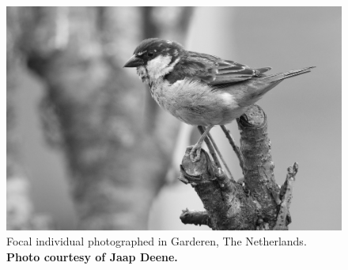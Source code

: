 \begin{titlepage}
\vspace{6\baselineskip}

\begin{figure}[h!]
\centering
\includegraphics[width=1\textwidth]{./Figures/Cover/Y150239Genomics_SIPicture.png}
\caption*{Focal individual photographed in Garderen, The Netherlands. \textbf{Photo courtesy of Jaap Deene.}}
\label{SI:SIPictire}
\end{figure}

\end{titlepage}
\restoregeometry